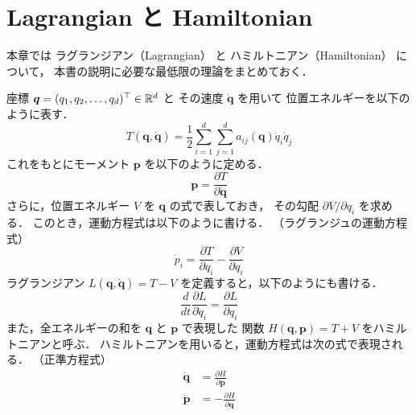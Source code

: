 %

\chapter{Lagrangian と Hamiltonian}\label{chap:lagrangian-and-hamiltonian}

本章では
ラグランジアン（Lagrangian）
と
ハミルトニアン（Hamiltonian）
について，
\cite[Chapter 3]{Morse1953}
本書の説明に必要な最低限の理論をまとめておく．

座標 $\bm{q} = (q_1, q_2, \ldots, q_d)^\top \in \mathbb{R}^d$ と
その速度 $\dot{\bm{q}}$ を用いて
位置エネルギーを以下のように表す．
\begin{equation}
    T(\bm{q}, \dot{\bm{q}}) = \frac{1}{2} \sum_{i=1}^d \sum_{j=1}^d a_{ij}(\bm{q}) \dot{q}_i \dot{q}_j
\end{equation}
これをもとにモーメント  $\bm{p}$ を以下のように定める．
\begin{equation}
    \bm{p} = \frac{\partial T}{\partial \dot{\bm{q}}}
\end{equation}
さらに，位置エネルギー $V$ を $\bm{q}$ の式で表しておき，
その勾配 $\partial V / \partial q_i$ を求める．
このとき，運動方程式は以下のように書ける．
（ラグランジュの運動方程式）
\begin{equation}
    \dot{p}_i = \frac{\partial T}{\partial q_i} - \frac{\partial V}{\partial q_i}
    \label{eq:lagrangian-and-hamiltonian_lagrange-equation}
\end{equation}
ラグランジアン $L(\bm{q}, \dot{\bm{q}}) = T - V$ を定義すると，以下のようにも書ける．
\begin{equation}
    \frac{d}{dt} \frac{\partial L}{\partial \dot{q}_i}
    = \frac{\partial L}{\partial q_i}
\end{equation}
また，全エネルギーの和を $\bm{q}$ と $\bm{p}$ で表現した
関数 $H(\bm{q}, \bm{p}) = T + V$ をハミルトニアンと呼ぶ．
ハミルトニアンを用いると，運動方程式は次の式で表現される．
（正準方程式）
\begin{align}
    \dot{\bm{q}} & = \frac{\partial H}{\partial \bm{p}}  \\
    \dot{\bm{p}} & = -\frac{\partial H}{\partial \bm{q}}
\end{align}
